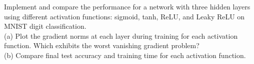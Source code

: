 \begin{myexercise}
Implement and compare the performance for a  network with three hidden layers using different activation functions: sigmoid, tanh, ReLU, and Leaky ReLU on MNIST digit classification. \\
(a) Plot the gradient norms at each layer during training for each activation function. Which exhibits the worst vanishing gradient problem? \\
(b) Compare final test accuracy and training time for each activation function.    
\end{myexercise}
